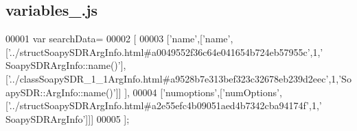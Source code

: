 \subsection{variables\+\_.\+js}
\label{variables__3_8js_source}

\begin{DoxyCode}
00001 var searchData=
00002 [
00003   [\textcolor{stringliteral}{'name'},[\textcolor{stringliteral}{'name'},[\textcolor{stringliteral}{'../structSoapySDRArgInfo.html#a0049552f36c64e041654b724eb57955c'},1,\textcolor{stringliteral}{'
      SoapySDRArgInfo::name()'}],[\textcolor{stringliteral}{'../classSoapySDR\_1\_1ArgInfo.html#a9528b7e313bef323c32678eb239d2eec'},1,\textcolor{stringliteral}{'SoapySDR::ArgInfo::name()'}]]
      ],
00004   [\textcolor{stringliteral}{'numoptions'},[\textcolor{stringliteral}{'numOptions'},[\textcolor{stringliteral}{'../structSoapySDRArgInfo.html#a2e55efc4b09051aed4b7342cba94174f'},1,\textcolor{stringliteral}{'
      SoapySDRArgInfo'}]]]
00005 ];
\end{DoxyCode}
